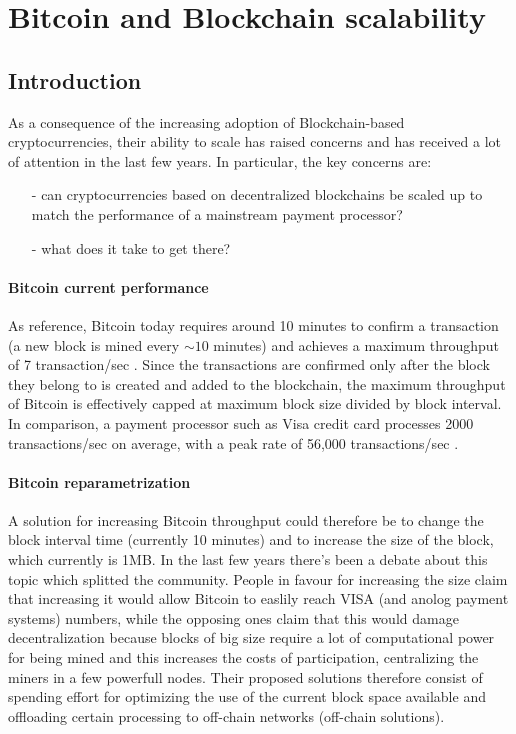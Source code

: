 \section{Bitcoin and Blockchain scalability}
\subsection{Introduction}
As a consequence of the increasing adoption of Blockchain-based cryptocurrencies,
their ability to scale has raised concerns and has received a lot of attention
in the last few years. In particular, the key concerns are:
\begin{itemize}
  \item[-] can cryptocurrencies based on decentralized blockchains be scaled up
  to match the performance of a mainstream payment processor?
  \item[-] what does it take to get there?
\end{itemize}

\paragraph{Bitcoin current performance} As reference, Bitcoin today requires
around 10 minutes to confirm a transaction (a new block is mined every $\sim10$
minutes) and achieves a maximum throughput of 7 transaction/sec
\cite{wikipedia_scalability_2018}. Since the transactions are confirmed only
after the block they belong to is created and added to the blockchain, the
maximum throughput of Bitcoin is effectively capped at maximum block size
divided by block interval. In comparison, a payment processor such as Visa
credit card processes 2000 transactions/sec on average, with a peak rate of
56,000 transactions/sec \cite{wikipedia_scalability_2018}.

\paragraph{Bitcoin reparametrization} A solution for increasing Bitcoin
throughput could therefore be to change the block interval time (currently 10 minutes)
and to increase the size of the block, which currently is 1MB. In the last few years there's been a
debate about this topic which splitted the community. People in favour for
increasing the size claim that increasing it would allow Bitcoin to easlily
reach VISA (and anolog payment systems) numbers, while the opposing ones claim
that this would damage decentralization because blocks of big size require a lot
of computational power for being mined and this increases the costs of
participation, centralizing the miners in a few powerfull nodes. Their proposed
solutions therefore consist of spending effort for optimizing the use of the
current block space available and offloading certain processing to off-chain
networks (off-chain solutions).

